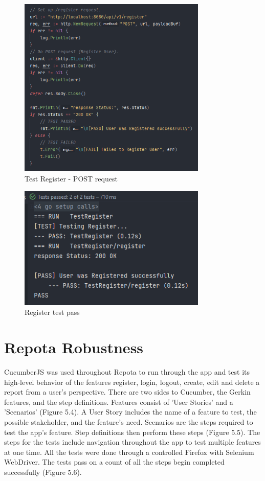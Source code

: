 \begin{figure}[H]
    \centering
    \caption{Test Register - POST request}
    \label{image:registerTestPostReq}
    \includegraphics[width=0.8\textwidth]{images/horton/tests/test_register_post.png}
\end{figure}

\begin{figure}[H]
    \centering
    \caption{Register test pass}
    \label{image:registerTestPass}
    \includegraphics[width=0.8\textwidth]{images/horton/tests/register_test_pass.png}
\end{figure}

\section{Repota Robustness}
CucumberJS was used throughout Repota to run through the app and test its high-level behavior of the features register, login, logout, create, edit and delete a report from a user's perspective. There are two sides to Cucumber, the Gerkin features, and the step definitions. Features consist of 'User Stories' and a 'Scenarios' (Figure 5.4). A User Story includes the name of a feature to test, the possible stakeholder, and the feature's need. Scenarios are the steps required to test the app's feature. Step definitions then perform these steps (Figure 5.5). The steps for the tests include navigation throughout the app to test multiple features at one time. All the tests were done through a controlled Firefox with Selenium WebDriver. The tests pass on a count of all the steps begin completed successfully (Figure 5.6).

